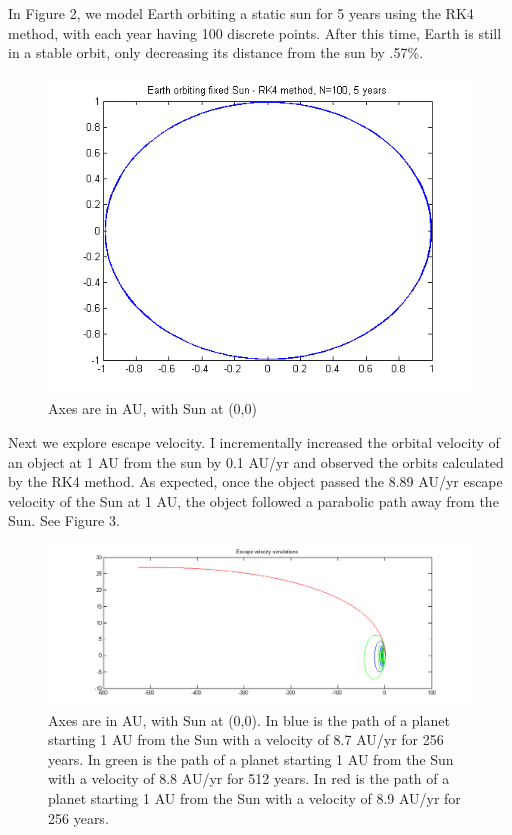 \documentclass[11pt]{article}
\begin{document}
In Figure 2,  we model Earth orbiting a static sun for 5 years using the RK4 method, with each year having 100 discrete points. After this time, Earth is still in a stable orbit, only decreasing its distance from the sun by .57\%.

\begin{figure}
	\includegraphics[width=\linewidth]{Earthrk4N100yr5}
	\caption{Axes are in AU, with Sun at (0,0)}
\end{figure}

Next we explore escape velocity. I incrementally increased the orbital velocity of an object at 1 AU from the sun by 0.1 AU/yr and observed the orbits calculated by the RK4 method. As expected, once the object passed the 8.89 AU/yr escape velocity of the Sun at 1 AU, the object followed a parabolic path away from the Sun. See Figure 3.

\begin{figure}
	\includegraphics[width=\linewidth]{escape}
	\caption{Axes are in AU, with Sun at (0,0). In blue is the path of a planet starting 1 AU from the Sun with a velocity of 8.7 AU/yr for 256 years. In green is the path of a planet starting 1 AU from the Sun with a velocity of 8.8 AU/yr for 512 years. In red is the path of a planet starting 1 AU from the Sun with a velocity of 8.9 AU/yr for 256 years.}
\end{figure}
\end{document}
